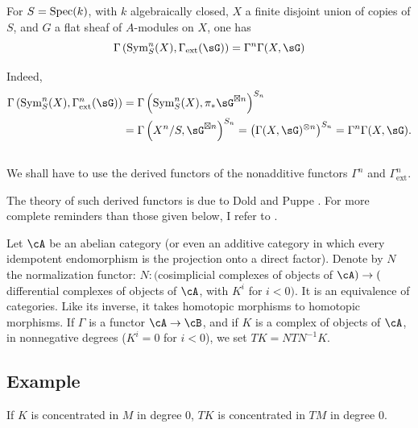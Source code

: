 \begin{lemma_}\label{III:1-3}
For $S=\operatorname{Spec}(k)$, with $k$ algebraically closed, $X$ a finite disjoint union of
copies of $S$, and $G$ a flat sheaf of $A$-modules on $X$, one has
\[
  \Gamma\left(\operatorname{Sym}_S^n(X),\Gamma_\text{ext}(\sG)\right) = \Gamma^n \Gamma(X,\sG)
\]
\end{lemma_}

Indeed,
\begin{align*}
  \Gamma\left(\operatorname{Sym}_S^n(X),\Gamma_\text{ext}^n(\sG)\right)
    &= \Gamma\left(\operatorname{Sym}_S^n(X),\pi_*\sG^{\boxtimes n}\right)^{S_n} \\
    &= \Gamma\left(X^n/S,\sG^{\boxtimes n}\right)^{S_n}
    = \left(\Gamma(X,\sG)^{\otimes n}\right)^{S_n}
    = \Gamma^n \Gamma(X,\sG) \text{.}
\end{align*}






\subsection{}\label{III:1-4}

We shall have to use the derived functors of the nonadditive functors
$\Gamma^n$ and $\Gamma_\text{ext}^n$.

The theory of such derived functors is due to Dold and Puppe
\cite{do61}. For more complete reminders than those given below, I refer to
\cite[XVII 5.5.3]{sga4}.

Let $\cA$ be an abelian category (or even an additive category in which every
idempotent endomorphism is the projection onto a direct factor). Denote by $N$
the normalization functor: $N:($cosimplicial complexes of objects of
$\cA)\to($differential complexes of objects of $\cA$, with $K^i$ for
$i<0)$. It is an equivalence of categories. Like its inverse, it takes
homotopic morphisms to homotopic morphisms. If $\Gamma$ is a functor
$\cA\to\cB$, and if $K$ is a complex of objects of $\cA$, in nonnegative
degrees ($K^i=0$ for $i<0$), we set $T K=N T N^{-1} K$.





\subsection{Example}\label{III:1-5}

If $K$ is concentrated in $M$ in degree $0$, $T K$ is concentrated in $T M$
in degree $0$.






